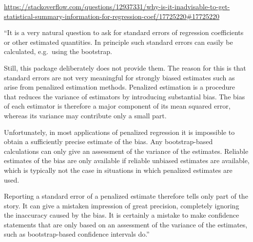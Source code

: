 \documentclass[
]{article}
\newenvironment{Shaded}{\begin{snugshade}}{\end{snugshade}}
\newcommand{\AttributeTok}[1]{\textcolor[rgb]{0.13,0.29,0.53}{#1}}
\newcommand{\CommentTok}[1]{\textcolor[rgb]{0.56,0.35,0.01}{\textit{#1}}}
\newcommand{\DecValTok}[1]{\textcolor[rgb]{0.00,0.00,0.81}{#1}}
\newcommand{\FunctionTok}[1]{\textcolor[rgb]{0.13,0.29,0.53}{\textbf{#1}}}
\newcommand{\NormalTok}[1]{#1}
\newcommand{\OtherTok}[1]{\textcolor[rgb]{0.56,0.35,0.01}{#1}}
\newcommand{\SpecialCharTok}[1]{\textcolor[rgb]{0.81,0.36,0.00}{\textbf{#1}}}
\begin{document}
\url{https://stackoverflow.com/questions/12937331/why-is-it-inadvisable-to-get-statistical-summary-information-for-regression-coef/17725220\#17725220}

``It is a very natural question to ask for standard errors of regression
coefficients or other estimated quantities. In principle such standard errors
can easily be calculated, e.g.~using the bootstrap.

Still, this package deliberately does not provide them. The reason for this is
that standard errors are not very meaningful for strongly biased estimates such
as arise from penalized estimation methods. Penalized estimation is a procedure
that reduces the variance of estimators by introducing substantial bias. The
bias of each estimator is therefore a major component of its mean squared error,
whereas its variance may contribute only a small part.

Unfortunately, in most applications of penalized regression it is impossible to
obtain a sufficiently precise estimate of the bias. Any bootstrap-based
calculations can only give an assessment of the variance of the estimates.
Reliable estimates of the bias are only available if reliable unbiased estimates
are available, which is typically not the case in situations in which penalized
estimates are used.

Reporting a standard error of a penalized estimate therefore tells only part of
the story. It can give a mistaken impression of great precision, completely
ignoring the inaccuracy caused by the bias. It is certainly a mistake to make
confidence statements that are only based on an assessment of the variance of
the estimates, such as bootstrap-based confidence intervals do.''

\begin{Shaded}
\end{Shaded}
\end{document}
